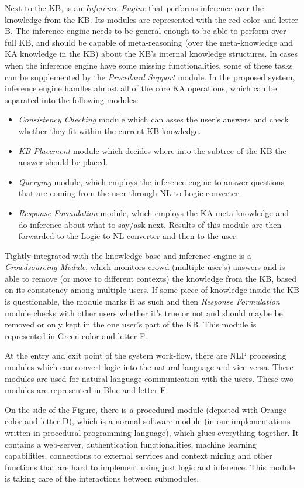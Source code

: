 Next to the KB, is an \emph{Inference Engine} that performs inference over 
the knowledge from the KB. Its modules are represented with the red color 
and letter B. The inference engine needs to be general enough to be able to
perform over full KB, and should be capable of meta-reasoning (over the 
meta-knowledge and KA knowledge in the KB) about the KB's internal knowledge
structures. In cases when the inference engine have some missing functionalities,
some of these tasks can be supplemented by the \emph{Procedural Support} 
module. In the proposed system, inference engine handles almost all of the 
core KA operations, which can be separated into the following modules:
\begin{itemize}
   \item \emph{Consistency Checking} module which can asses the user's answers
   and check whether they fit within the current KB knowledge.
   \item \emph{KB Placement} module which decides where into the subtree of the
   KB the answer should be placed.
   \item \emph{Querying} module, which employs the inference engine to answer
   questions that are coming from the user through NL to Logic converter.
   \item \emph{Response Formulation} module, which employs the KA meta-knowledge
   and do inference about what to say/ask next. Results of this module are then
   forwarded to the Logic to NL converter and then to the user.
\end{itemize}

Tightly integrated with the knowledge base and inference engine is a 
\emph{Crowdsourcing Module}, which monitors crowd (multiple user's) answers and 
is able to remove (or move to different contexts) the knowledge from the KB, 
based on its consistency among multiple users. If some piece of knowledge inside
the KB is questionable, the module marks it as such and then \emph{Response
Formulation} module checks with other users whether it's true or not and should
maybe be removed or only kept in the one user's part of the KB. This module is 
represented in Green color and letter F.

At the entry and exit point of the system work-flow, there are NLP processing  
modules which can convert logic into the natural language and vice versa. These
modules are used for natural language communication with the users. These two
modules are represented in Blue and letter E.

On the side of the Figure, there is a procedural module (depicted with Orange
color and letter D), which is a normal software module (in our implementations
written in procedural programming language), which glues everything together.
It contains a web-server, authentication functionalities, machine
learning capabilities, connections to external services and context mining
and other functions that are hard to implement using just logic and inference.
This module is taking care of the interactions between submodules. 

